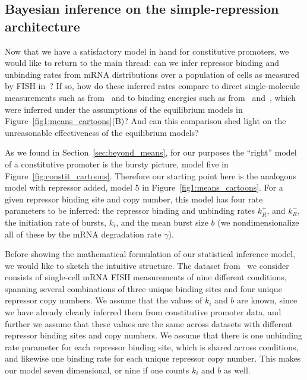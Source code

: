 \subsection{Bayesian inference on the simple-repression architecture}

Now that we have a satisfactory model in hand for constitutive
promoters, we would like to return to the main thread: can we
infer repressor binding and unbinding rates from mRNA distributions
over a population of cells as measured by FISH in~\cite{Jones2014}?
If so, how do these inferred rates compare to direct
single-molecule measurements such as from~\cite{Hammar2014} and
to binding energies such as from~\cite{Garcia2011a}
and~\cite{Razo-Mejia2018}, which were inferred under the assumptions
of the equilibrium models in Figure~\ref{fig1:means_cartoons}(B)?
And can this comparison shed light on the unreasonable effectiveness
of the equilibrium models?

As we found in Section~\ref{sec:beyond_means}, for our purposes
the ``right'' model of a constitutive promoter is the bursty
picture, model five in Figure~\ref{fig:constit_cartoons}.
Therefore our starting point here is the analogous model with
repressor added, model 5 in Figure~\ref{fig1:means_cartoons}.
For a given repressor binding site and copy number,
this model has four rate parameters to be inferred:
the repressor binding and unbinding rates $k_R^+$, and $k_R^-$,
the initiation rate of bursts, $k_i$, and the mean burst size $b$
(we nondimensionalize all of these by the mRNA degradation rate $\gamma$).

Before showing the mathematical formulation of our statistical
inference model, we would like to sketch the intuitive structure.
The dataset from~\cite{Jones2014} we consider consists of
single-cell mRNA FISH measurements of nine different conditions,
spanning several combinations of three unique binding sites and
four unique repressor copy numbers. We assume that the values of
$k_i$ and $b$ are known, since we have already cleanly inferred
them from constitutive promoter data, and further we assume that
these values are the same across datasets with different
repressor binding sites and copy numbers. We assume that there is
one unbinding rate parameter for each repressor binding site,
which is shared across conditions, and likewise one binding rate
for each unique repressor copy number. This makes our model seven
dimensional, or nine if one counts $k_i$ and $b$ as well.

